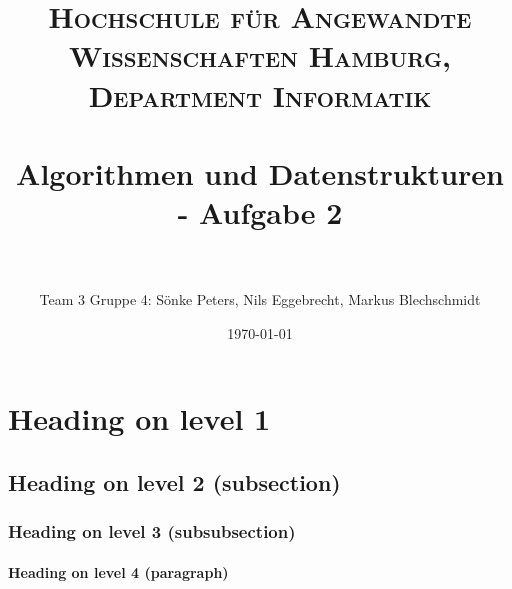 \documentclass[paper=a4, fontsize=11pt]{scrartcl} %
\title{
\normalfont \normalsize
\textsc{Hochschule für Angewandte Wissenschaften Hamburg, Department Informatik} \\ [25pt] %
\horrule{0.5pt} \\[0.4cm] %
\huge Algorithmen und Datenstrukturen - Aufgabe 2 \\ %
\horrule{2pt} \\[0.5cm] %
}
\author{Team 3 Gruppe 4: Sönke Peters, Nils Eggebrecht, Markus Blechschmidt} %
\date{\normalsize\today} %
\numberwithin{equation}{section} %
\numberwithin{figure}{section} %
\numberwithin{table}{section} %
\begin{document}
\maketitle %

\section{Heading on level 1}


\subsection{Heading on level 2 (subsection)}


\subsubsection{Heading on level 3 (subsubsection)}

\paragraph{Heading on level 4 (paragraph)}
\end{document}
